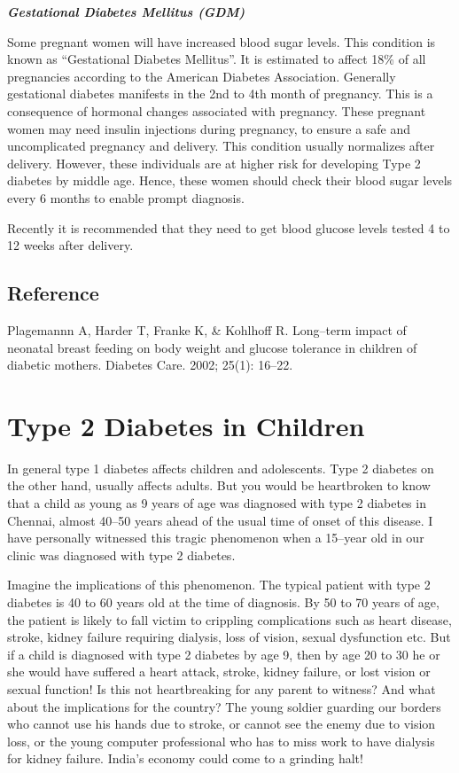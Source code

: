 \textbf{\textit{Gestational Diabetes Mellitus (GDM)}}

Some pregnant women will have increased blood sugar levels. This condition is known as “Gestational Diabetes Mellitus”. It is estimated to affect 18\% of all pregnancies according to the American Diabetes Association. Generally gestational diabetes manifests in the 2nd to 4th month of pregnancy. This is a consequence of hormonal changes associated with pregnancy. These pregnant women may need insulin injections during pregnancy, to ensure a safe and uncomplicated pregnancy and delivery. This condition usually normalizes after delivery. However, these individuals are at higher risk for developing Type 2 diabetes by middle age. Hence, these women should check their blood sugar levels every 6 months to enable prompt diagnosis.

Recently it is recommended that they need to get blood glucose levels tested 4 to 12 weeks after delivery.

\section*{Reference}

\begin{thebibliography}{99}
 Plagemannn A, Harder T, Franke K, \& Kohlhoff R. Long–term impact of neonatal breast feeding on body weight and glucose tolerance in children of diabetic mothers. Diabetes Care. 2002; 25(1): 16–22.

 \end{thebibliography}


\chapter{Type 2 Diabetes in Children}

In general type 1 diabetes affects children and adolescents. Type 2 diabetes on the other hand, usually affects adults. But you would be heartbroken to know that a child as young as 9 years of age was diagnosed with type 2 diabetes in Chennai, almost 40–50 years ahead of the usual time of onset of this disease. I have personally witnessed this tragic phenomenon when a 15–year old in our clinic was diagnosed with type 2 diabetes.

Imagine the implications of this phenomenon. The typical patient with type 2 diabetes is 40 to 60 years old at the time of diagnosis. By 50 to 70 years of age, the patient is likely to fall victim to crippling complications such as heart disease, stroke, kidney failure requiring dialysis, loss of vision, sexual dysfunction etc. But if a child is diagnosed with type 2 diabetes by age 9, then by age 20 to 30 he or she would have suffered a heart attack, stroke, kidney failure, or lost vision or sexual function! Is this not heartbreaking for any parent to witness? And what about the implications for the country? The young soldier guarding our borders who cannot use his hands due to stroke, or cannot see the enemy due to vision loss, or the young computer professional who has to miss work to have dialysis for kidney failure. India’s economy could come to a grinding halt!

